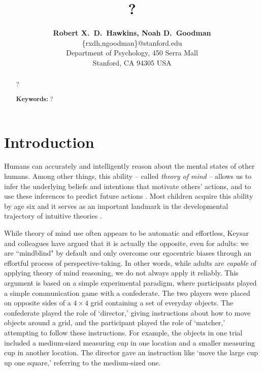 \documentclass[10pt,letterpaper]{article}
\title{?}
\author{{\large \bf Robert X.~D.~Hawkins, Noah D.~Goodman}\\
  \{rxdh,ngoodman\}@stanford.edu\\
  Department of Psychology, 450 Serra Mall \\
  Stanford, CA 94305 USA}
\begin{document}
\maketitle

\begin{abstract}
?

\textbf{Keywords:} 
?
\end{abstract}

\section{Introduction}
\label{sec:intro}

Humans can accurately and intelligently reason about the mental states of other humans. Among other things, this ability -- called \emph{theory of mind} \cite{PremackWoodruff78_ChimpanzeeToM} -- allows us to infer the underlying beliefs and intentions that motivate others' actions, and to use these inferences to predict future actions \cite{BakerSaxeTenenbaum09_ActionUnderstandingInversePlanning}. Most children acquire this ability by age six \cite{WimmerPerner83_BeliefsAboutBeliefs, WellmanCrossWatson01_ToMMetaAnalysis} and it serves as an important landmark in the developmental trajectory of intuitive theories \cite{GopnikWellman12_ReconstructingConstructivism}.

While theory of mind use often appears to be automatic and effortless, Keysar and colleagues \cite{KeysarBarr___Brauner00_TakingPerspective, KeysarLinBarr03_LimitsOnTheoryOfMindUse, LinKeysarEpley10_ReflexivelyMindblind} have argued that it is actually the opposite, even for adults: we are ``mindblind" by default and only overcome our egocentric biases through an effortful process of perspective-taking. In other words, while adults are \emph{capable} of applying theory of mind reasoning, we do not always apply it reliably. This argument is based on a simple experimental paradigm, where participants played a simple communication game with a confederate. The two players were placed on opposite sides of a $4 \times 4$ grid containing a set of everyday objects. The confederate played the role of `director,' giving instructions about how to move objects around a grid, and the participant played the role of `matcher,' attempting to follow these instructions. For example, the objects in one trial included a medium-sized measuring cup in one location and a smaller measuring cup in another location. The director gave an instruction like `move the large cup up one square,' referring to the medium-sized one. 
\end{document}
